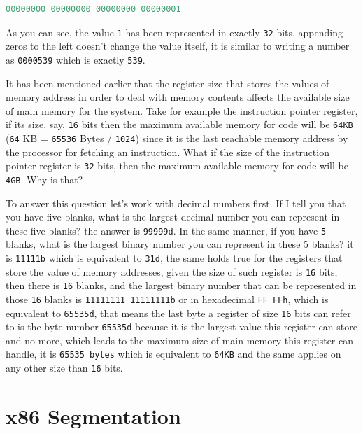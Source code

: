 \begin{lstlisting}[language=C]
00000000 00000000 00000000 00000001
\end{lstlisting}

As you can see, the value \lstinline!1! has been represented in exactly
\lstinline!32! bits, appending zeros to the left doesn't change the
value itself, it is similar to writing a number as \lstinline!0000539!
which is exactly \lstinline!539!.

It has been mentioned earlier that the register size that stores the
values of memory address in order to deal with memory contents affects
the available size of main memory for the system. Take for example the
instruction pointer register, if its size, say, \lstinline!16! bits then
the maximum available memory for code will be \lstinline!64KB!
(\lstinline!64! KB = \lstinline!65536! Bytes / \lstinline!1024!) since
it is the last reachable memory address by the processor for fetching an
instruction. What if the size of the instruction pointer register is
\lstinline!32! bits, then the maximum available memory for code will be
\lstinline!4GB!. Why is that?

To answer this question let's work with decimal numbers first. If I tell
you that you have five blanks, what is the largest decimal number you
can represent in these five blanks? the answer is \lstinline!99999d!. In
the same manner, if you have \lstinline!5! blanks, what is the largest
binary number you can represent in these 5 blanks? it is
\lstinline!11111b! which is equivalent to \lstinline!31d!, the same
holds true for the registers that store the value of memory addresses,
given the size of such register is \lstinline!16! bits, then there is
\lstinline!16! blanks, and the largest binary number that can be
represented in those \lstinline!16! blanks is
\lstinline!11111111 11111111b! or in hexadecimal \lstinline!FF FFh!,
which is equivalent to \lstinline!65535d!, that means the last byte a
register of size \lstinline!16! bits can refer to is the byte number
\lstinline!65535d! because it is the largest value this register can
store and no more, which leads to the maximum size of main memory this
register can handle, it is \lstinline!65535 bytes! which is equivalent
to \lstinline!64KB! and the same applies on any other size than
\lstinline!16! bits.

\section{x86 Segmentation}\label{x86-segmentation}

